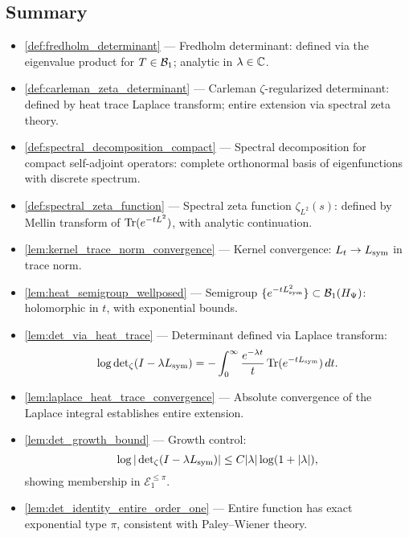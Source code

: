 \subsection*{Summary}

\begin{itemize}
  \item \cref{def:fredholm_determinant} — Fredholm determinant: defined via the eigenvalue product for \( T \in \mathcal{B}_1 \); analytic in \( \lambda \in \mathbb{C} \).

  \item \cref{def:carleman_zeta_determinant} — Carleman \(\zeta\)-regularized determinant: defined by heat trace Laplace transform; entire extension via spectral zeta theory.

  \item \cref{def:spectral_decomposition_compact} — Spectral decomposition for compact self-adjoint operators: complete orthonormal basis of eigenfunctions with discrete spectrum.

  \item \cref{def:spectral_zeta_function} — Spectral zeta function \( \zeta_{L^2}(s) \): defined by Mellin transform of \( \operatorname{Tr}(e^{-t L^2}) \), with analytic continuation.

  \item \cref{lem:kernel_trace_norm_convergence} — Kernel convergence: \( L_t \to L_{\mathrm{sym}} \) in trace norm.

  \item \cref{lem:heat_semigroup_wellposed} — Semigroup \( \{e^{-tL_{\mathrm{sym}}^2}\} \subset \mathcal{B}_1(H_{\Psi}) \): holomorphic in \( t \), with exponential bounds.

  \item \cref{lem:det_via_heat_trace} — Determinant defined via Laplace transform:
  \[
  \log \det\nolimits_{\zeta}(I - \lambda L_{\mathrm{sym}}) = - \int_0^\infty \frac{e^{-\lambda t}}{t} \operatorname{Tr}(e^{-t L_{\mathrm{sym}}}) \, dt.
  \]

  \item \cref{lem:laplace_heat_trace_convergence} — Absolute convergence of the Laplace integral establishes entire extension.

  \item \cref{lem:det_growth_bound} — Growth control:
  \[
  \log |\det\nolimits_{\zeta}(I - \lambda L_{\mathrm{sym}})| \le C |\lambda| \log(1 + |\lambda|),
  \]
  showing membership in \( \mathcal{E}_1^{\leq \pi} \).

  \item \cref{lem:det_identity_entire_order_one} — Entire function has exact exponential type \( \pi \), consistent with Paley--Wiener theory.


\end{itemize}
